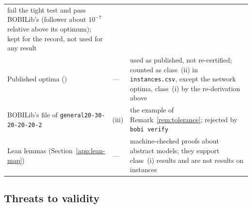 {\begin{longtable}{@{}>{\raggedright\arraybackslash}p{2.35in}l>{\raggedright\arraybackslash}p{3.0in}@{}}
fail the tight test and pass BOBILib's (follower about $10^{-7}$ relative above
its optimum); kept for the record, not used for any result\\[2pt]
Published optima (\NumLitOptimal{}) & --- & used as published, not re-certified;
counted as class~(ii) in \texttt{instances.csv}, except the \NumClassExactLit{} network
optima, class~(i) by the re-derivation above\\[2pt]
BOBILib's file of \texttt{general20-30-20-20-20-2} & (iii) & the example of
Remark~\ref{rem:tolerance}; rejected by \texttt{bobi verify}\\[2pt]
Lean lemmas (Section~\ref{app:lean-map}) & --- & machine-checked proofs about
abstract models; they support class~(i) results and are not results on
instances\\
\end{longtable}
}
\addtocounter{table}{-1}

\subsection{Threats to validity}\label{app:threats}

